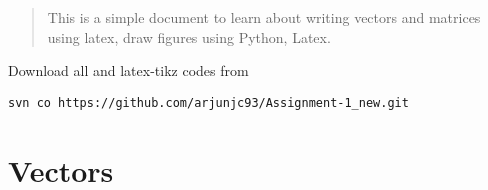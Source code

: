 \documentclass[journal,12pt,twocolumn]{IEEEtran}
\begin{document}
\newpage
\bigskip
\renewcommand{\thefigure}{\theenumi}
\renewcommand{\thetable}{\theenumi}
\begin{abstract}
This is a simple document to learn about writing vectors and matrices using latex, draw figures using Python, Latex.
\end{abstract}
%
Download all and latex-tikz codes from 
%
\begin{lstlisting}
svn co https://github.com/arjunjc93/Assignment-1_new.git
\end{lstlisting}
%
\section{Vectors}
\renewcommand{\theequation}{\theenumi}
\end{document}
